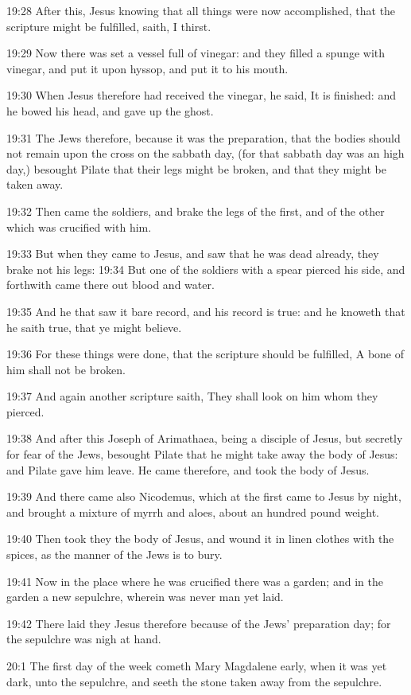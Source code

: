 19:28 After this, Jesus knowing that all things were now accomplished, that the scripture might be fulfilled, saith, I thirst.

19:29 Now there was set a vessel full of vinegar: and they filled a spunge with vinegar, and put it upon hyssop, and put it to his mouth.

19:30 When Jesus therefore had received the vinegar, he said, It is finished: and he bowed his head, and gave up the ghost.

19:31 The Jews therefore, because it was the preparation, that the bodies should not remain upon the cross on the sabbath day, (for that sabbath day was an high day,) besought Pilate that their legs might be broken, and that they might be taken away.

19:32 Then came the soldiers, and brake the legs of the first, and of the other which was crucified with him.

19:33 But when they came to Jesus, and saw that he was dead already, they brake not his legs: 19:34 But one of the soldiers with a spear pierced his side, and forthwith came there out blood and water.

19:35 And he that saw it bare record, and his record is true: and he knoweth that he saith true, that ye might believe.

19:36 For these things were done, that the scripture should be fulfilled, A bone of him shall not be broken.

19:37 And again another scripture saith, They shall look on him whom they pierced.

19:38 And after this Joseph of Arimathaea, being a disciple of Jesus, but secretly for fear of the Jews, besought Pilate that he might take away the body of Jesus: and Pilate gave him leave. He came therefore, and took the body of Jesus.

19:39 And there came also Nicodemus, which at the first came to Jesus by night, and brought a mixture of myrrh and aloes, about an hundred pound weight.

19:40 Then took they the body of Jesus, and wound it in linen clothes with the spices, as the manner of the Jews is to bury.

19:41 Now in the place where he was crucified there was a garden; and in the garden a new sepulchre, wherein was never man yet laid.

19:42 There laid they Jesus therefore because of the Jews' preparation day; for the sepulchre was nigh at hand.

20:1 The first day of the week cometh Mary Magdalene early, when it was yet dark, unto the sepulchre, and seeth the stone taken away from the sepulchre.


